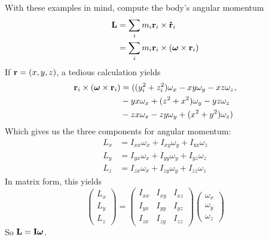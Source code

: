 With these examples in mind, compute the body's angular momentum
\begin{align*}
    \mathbf{L} &= \sum_i m_i \mathbf{r}_i \times \mathbf{\dot r}_i \\
    &= \sum_i m_i \mathbf{r}_i \times (\boldsymbol{\omega} \times \mathbf{r}_i) 
\end{align*}
If $\mathbf{r} = (x,y,z)$, a tedious calculation yields
\begin{align*}
    \mathbf{r}_i \times(\boldsymbol{\omega} \times \mathbf{r}_i) &= ((y_i^2+z_i^2)\omega_x-xy\omega_y -xz\omega_z, \\
    &-yx\omega_x + (z^2+x^2)\omega_y -yz\omega_z \\
    &-zx\omega_x - zy\omega_y + (x^2+y^2)\omega_z)
\end{align*}
Which gives us the three components for angular momentum:
\begin{align*}
    L_x &= I_{xx}\omega_x + I_{xy}\omega_y + I_\text{xz}\omega _z \\
    L_y &= I_{yx}\omega_x + I_{yy}\omega_y + I_{yz}\omega_z \\
    L_z &= I_{zx}\omega_x + I_{zy}\omega_y + I_{zz}\omega_z
\end{align*}
In matrix form, this yields
\[ \begin{pmatrix}
    L_x \\ L_y \\ L_z
\end{pmatrix} = \begin{pmatrix}
    I_{xx} & I_{xy} & I_{xz} \\
    I_{yx} & I_{yy} & I_{yz} \\
    I_{zx} & I_{zy} & I_{zz}
\end{pmatrix}\begin{pmatrix}
    \omega_x\\ \omega_y \\ \omega_z
\end{pmatrix}\]
So $\mathbf{L} = \mathbf{I} \boldsymbol{\omega}$.


